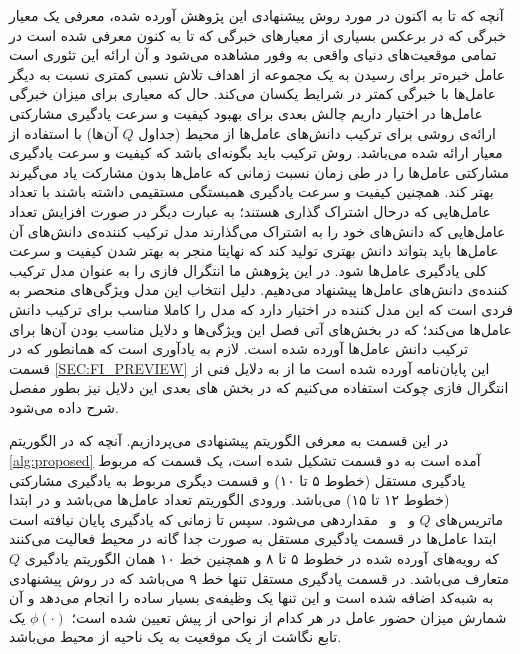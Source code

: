 آنچه که تا به اکنون در مورد روش پیشنهادی این پژوهش آورده شده، معرفی یک معیار خبرگی که در برعکس بسیاری از معیارهای خبرگی که تا به کنون معرفی شده است در تمامی موقعیت‌های دنیای واقعی به وفور مشاهده می‌شود و آن ارائه این تئوری است عامل خبره‌تر برای رسیدن به یک مجموعه از اهداف تلاش نسبی کمتری نسبت به دیگر عامل‌ها با خبرگی کمتر در شرایط یکسان می‌کند. حال که معیاری برای میزان خبرگی عامل‌ها در اختیار داریم چالش بعدی برای بهبود کیفیت و سرعت یادگیری مشارکتی ارائه‌ی روشی برای ترکیب دانش‌های عامل‌ها از محیط (جداول $Q$ آن‌ها) با استفاده از معیار ارائه شده می‌باشد. روش ترکیب باید بگونه‌ای باشد که کیفیت و سرعت یادگیری مشارکتی عامل‌ها را در طی زمان نسبت زمانی که عامل‌ها بدون مشارکت یاد می‌گیرند بهتر کند. همچنین کیفیت و سرعت یادگیری همبستگی مستقیمی داشته باشند با تعداد عامل‌هایی که درحال اشتراک گذاری هستند؛ به عبارت دیگر در صورت افزایش تعداد عامل‌هایی که دانش‌های خود را به اشتراک می‌گذارند مدل ترکیب کننده‌ی دانش‌های آن‌ عامل‌ها باید بتواند دانش‌ بهتری تولید کند که نهایتا منجر به بهتر شدن کیفیت و سرعت کلی یادگیری عامل‌ها شود.
در این پژوهش ما انتگرال فازی را به عنوان مدل ترکیب کننده‌ی دانش‌های عامل‌ها پیشنهاد می‌دهیم. دلیل انتخاب این مدل ویژگی‌های منحصر به فردی است که این مدل کننده در اختیار دارد که مدل را کاملا مناسب برای ترکیب دانش‌ عامل‌ها می‌کند؛ که در بخش‌های آتی فصل این ویژگی‌ها و دلایل مناسب بودن آن‌ها برای ترکیب دانش عامل‌ها آورده شده است. لازم به یاد‌آوری است که همانطور که در قسمت
\ref{SEC:FI_PREVIEW}
این پایان‌نامه آورده شده است ما از به دلایل فنی از انتگرال فازی چوکت استفاده می‌کنیم که در بخش‌ های بعدی این دلایل نیز بطور مفصل شرح داده می‌شود.

در این قسمت به معرفی الگوریتم پیشنهادی می‌پردازیم. آنچه که در الگوریتم
\ref{alg:proposed}
آمده است به دو قسمت تشکیل شده است، یک قسمت که مربوط یادگیری مستقل (خطوط ۵ تا ۱۰) و قسمت دیگری مربوط به یادگیری مشارکتی (خطوط ۱۲ تا ۱۵) می‌باشد. ورودی الگوریتم تعداد عامل‌ها می‌باشد و در ابتدا ماتریس‌های $Q$ و \ و \ مقداردهی می‌شود. سپس تا زمانی که یادگیری پایان نیافته است ابتدا عامل‌ها در قسمت یادگیری مستقل به صورت جدا گانه در محیط فعالیت می‌کنند که رویه‌های آورده شده در خطوط ۵ تا ۸ و همچنین خط ۱۰ همان الگوریتم یادگیری $Q$ متعارف می‌باشد. در قسمت یادگیری مستقل تنها خط ۹ می‌باشد که در روش پیشنهادی به شبه‌کد اضافه شده است و این تنها یک وظیفه‌ی بسیار ساده را انجام می‌دهد و آن شمارش میزان حضور عامل در هر کدام از نواحی از پیش تعیین شده است؛ $\phi(\cdot)$ یک تابع نگاشت از یک موقعیت به یک ناحیه از محیط می‌باشد.

